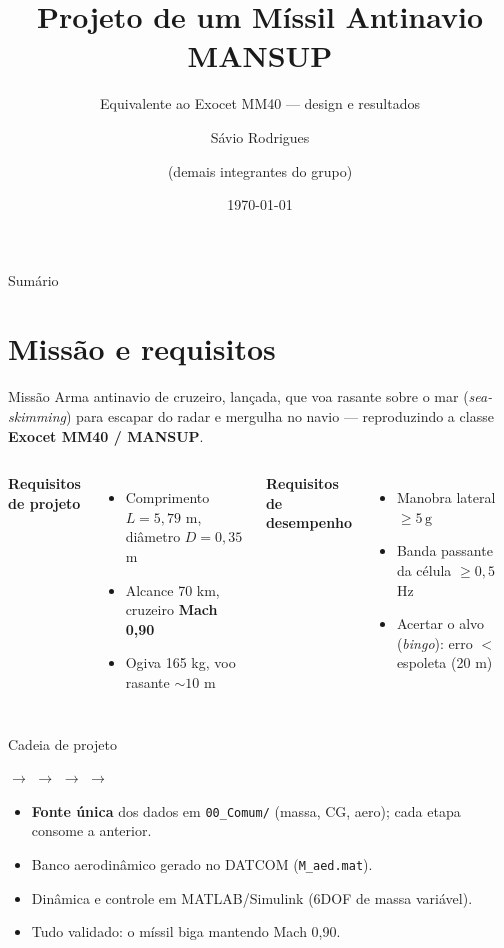 \documentclass[aspectratio=169,11pt]{beamer}
\title[Míssil Antinavio MANSUP]{Projeto de um Míssil Antinavio MANSUP}
\subtitle{Equivalente ao Exocet MM40 --- design e resultados}
\author[Grupo PRJ-75]{Sávio Rodrigues \and (demais integrantes do grupo)}
\institute[ITA]{Instituto Tecnológico de Aeronáutica --- PRJ-75}
\date{\today}
\newcommand{\gee}{\,\mathrm{g}}            %
\begin{document}
\begin{frame}[plain]
  \titlepage
\end{frame}

\begin{frame}{Sumário}
  \tableofcontents
\end{frame}

\section{Missão e requisitos}
\begin{frame}{Missão}
  Arma antinavio de cruzeiro, lançada, que voa \alert{rasante sobre o mar}
  (\textit{sea-skimming}) para escapar do radar e mergulha no navio ---
  reproduzindo a classe \textbf{Exocet MM40 / MANSUP}.
  \vfill
  \begin{columns}[T]
      \textbf{Requisitos de projeto}
      \begin{itemize}
        \item Comprimento $L = 5{,}79$ m, diâmetro $D = 0{,}35$ m
        \item Alcance 70 km, cruzeiro \textbf{Mach 0{,}90}
        \item Ogiva 165 kg, voo rasante $\sim 10$ m
      \end{itemize}
      \textbf{Requisitos de desempenho}
      \begin{itemize}
        \item Manobra lateral $\geq 5\gee$
        \item Banda passante da célula $\geq 0{,}5$ Hz
        \item Acertar o alvo (\textit{bingo}): erro $<$ espoleta (20 m)
      \end{itemize}
  \end{columns}
\end{frame}

\begin{frame}{Cadeia de projeto}
  \begin{center}
  \footnotesize
   $\rightarrow$ 
  $\rightarrow$  $\rightarrow$ 
  $\rightarrow$ 
  \end{center}
  \vfill
  \begin{itemize}
    \item \textbf{Fonte única} dos dados em \texttt{00\_Comum/} (massa, CG, aero);
          cada etapa consome a anterior.
    \item Banco aerodinâmico gerado no DATCOM (\texttt{M\_aed.mat}).
    \item Dinâmica e controle em MATLAB/Simulink (6DOF de massa variável).
    \item Tudo validado: o míssil \alert{biga} mantendo Mach 0{,}90.
  \end{itemize}
\end{frame}
\end{document}
